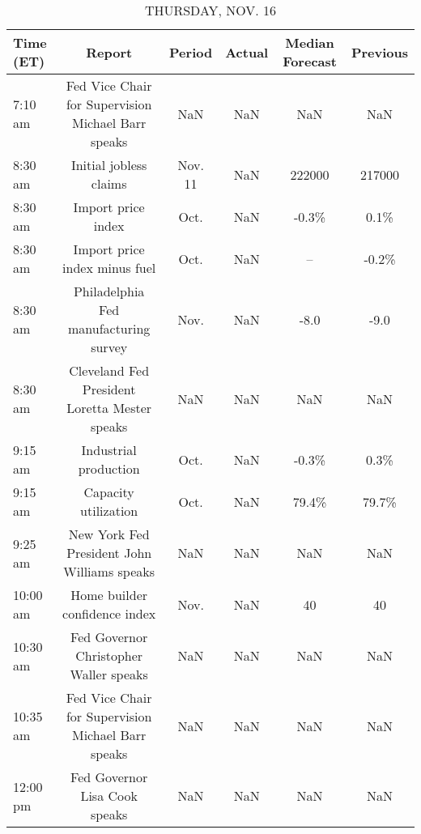 \documentclass{article}%
\begin{document}
\begin{table}[htbp]%
\caption{THURSDAY, NOV. 16}%
\centering%
\begin{adjustbox}{width=1\textwidth}%
\begin{tabular}{lccccc}
\toprule
Time (ET) &                                             Report &  Period & Actual & Median Forecast & Previous \\
\midrule
  7:10 am & Fed Vice Chair for Supervision Michael Barr speaks &     NaN &    NaN &             NaN &      NaN \\
  8:30 am &                             Initial jobless claims & Nov. 11 &    NaN &          222000 &   217000 \\
  8:30 am &                                 Import price index &    Oct. &    NaN &           -0.3\% &     0.1\% \\
  8:30 am &                      Import price index minus fuel &    Oct. &    NaN &              -- &    -0.2\% \\
  8:30 am &              Philadelphia Fed manufacturing survey &    Nov. &    NaN &            -8.0 &     -9.0 \\
  8:30 am &      Cleveland Fed President Loretta Mester speaks &     NaN &    NaN &             NaN &      NaN \\
  9:15 am &                              Industrial production &    Oct. &    NaN &           -0.3\% &     0.3\% \\
  9:15 am &                               Capacity utilization &    Oct. &    NaN &           79.4\% &    79.7\% \\
  9:25 am &        New York Fed President John Williams speaks &     NaN &    NaN &             NaN &      NaN \\
 10:00 am &                      Home builder confidence index &    Nov. &    NaN &              40 &       40 \\
 10:30 am &             Fed Governor Christopher Waller speaks &     NaN &    NaN &             NaN &      NaN \\
 10:35 am & Fed Vice Chair for Supervision Michael Barr speaks &     NaN &    NaN &             NaN &      NaN \\
 12:00 pm &                      Fed Governor Lisa Cook speaks &     NaN &    NaN &             NaN &      NaN \\
\bottomrule
\end{tabular}
%
\end{adjustbox}%
\end{table}
\end{document}
